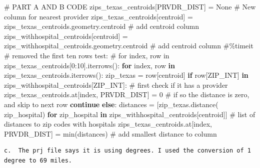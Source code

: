 \documentclass[
  letterpaper,
  DIV=11,
  numbers=noendperiod]{scrartcl}
\newenvironment{Shaded}{\begin{snugshade}}{\end{snugshade}}
\newcommand{\BuiltInTok}[1]{\textcolor[rgb]{0.00,0.23,0.31}{#1}}
\newcommand{\CommentTok}[1]{\textcolor[rgb]{0.37,0.37,0.37}{#1}}
\newcommand{\ControlFlowTok}[1]{\textcolor[rgb]{0.00,0.23,0.31}{\textbf{#1}}}
\newcommand{\DecValTok}[1]{\textcolor[rgb]{0.68,0.00,0.00}{#1}}
\newcommand{\KeywordTok}[1]{\textcolor[rgb]{0.00,0.23,0.31}{\textbf{#1}}}
\newcommand{\NormalTok}[1]{\textcolor[rgb]{0.00,0.23,0.31}{#1}}
\newcommand{\OperatorTok}[1]{\textcolor[rgb]{0.37,0.37,0.37}{#1}}
\newcommand{\StringTok}[1]{\textcolor[rgb]{0.13,0.47,0.30}{#1}}
\newcommand{\VariableTok}[1]{\textcolor[rgb]{0.07,0.07,0.07}{#1}}
\begin{document}
\begin{Shaded}
\begin{Highlighting}[]
\CommentTok{\# PART A AND B CODE}
\NormalTok{zips\_texas\_centroids[}\StringTok{\textquotesingle{}PRVDR\_DIST\textquotesingle{}}\NormalTok{] }\OperatorTok{=} \VariableTok{None}  \CommentTok{\# New column for nearest provider}
\NormalTok{zips\_texas\_centroids[}\StringTok{\textquotesingle{}centroid\textquotesingle{}}\NormalTok{] }\OperatorTok{=}\NormalTok{ zips\_texas\_centroids.geometry.centroid }\CommentTok{\# add centroid column}
\NormalTok{zips\_withhospital\_centroids[}\StringTok{\textquotesingle{}centroid\textquotesingle{}}\NormalTok{] }\OperatorTok{=}\NormalTok{ zips\_withhospital\_centroids.geometry.centroid }\CommentTok{\# add centroid column}
\CommentTok{\#\%timeit}
\CommentTok{\# removed the first ten rows test:}
\CommentTok{\# for index, row in zips\_texas\_centroids[0:10].iterrows():}
\ControlFlowTok{for}\NormalTok{ index, row }\KeywordTok{in}\NormalTok{ zips\_texas\_centroids.iterrows():}
\NormalTok{    zip\_texas }\OperatorTok{=}\NormalTok{ row[}\StringTok{\textquotesingle{}centroid\textquotesingle{}}\NormalTok{]}
    \ControlFlowTok{if}\NormalTok{ row[}\StringTok{\textquotesingle{}ZIP\_INT\textquotesingle{}}\NormalTok{] }\KeywordTok{in}\NormalTok{ zips\_withhospital\_centroids[}\StringTok{\textquotesingle{}ZIP\_INT\textquotesingle{}}\NormalTok{]: }\CommentTok{\# first check if it has a provider}
\NormalTok{        zips\_texas\_centroids.at[index, }\StringTok{\textquotesingle{}PRVDR\_DIST\textquotesingle{}}\NormalTok{] }\OperatorTok{=} \DecValTok{0} \CommentTok{\# if so the distance is zero, and skip to next row}
        \ControlFlowTok{continue}
    \ControlFlowTok{else}\NormalTok{:}
\NormalTok{        distances }\OperatorTok{=}\NormalTok{ [zip\_texas.distance(}
\NormalTok{        zip\_hospital) }\ControlFlowTok{for}\NormalTok{ zip\_hospital }\KeywordTok{in}\NormalTok{ zips\_withhospital\_centroids[}\StringTok{\textquotesingle{}centroid\textquotesingle{}}\NormalTok{]] }\CommentTok{\# list of distances to zip codes with hospitals}
\NormalTok{        zips\_texas\_centroids.at[index, }\StringTok{\textquotesingle{}PRVDR\_DIST\textquotesingle{}}\NormalTok{] }\OperatorTok{=} \BuiltInTok{min}\NormalTok{(distances) }\CommentTok{\# add smallest distance to column}
\end{Highlighting}
\end{Shaded}

\begin{verbatim}
c.  The prj file says it is using degrees. I used the conversion of 1 degree to 69 miles.
\end{verbatim}
\end{document}
